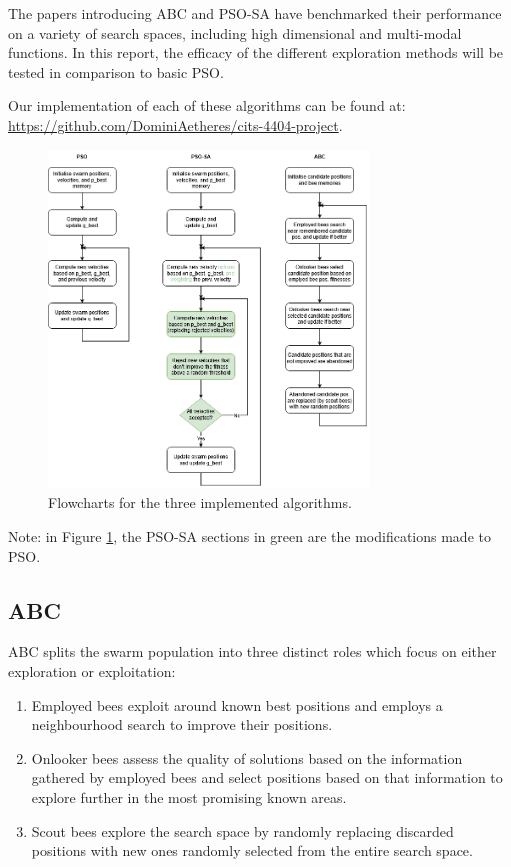 \documentclass[a4paper, 12pt]{extarticle}
\begin{document}
The papers introducing ABC and PSO-SA have benchmarked their performance on a variety of search spaces, including high dimensional and multi-modal functions. In this report, the efficacy of the different exploration methods will be tested in comparison to basic PSO. 

Our implementation of each of these algorithms can be found at:\newline
\href{https://github.com/DominiAetheres/cits-4404-project}{https://github.com/DominiAetheres/cits-4404-project}.

\begin{figure}[H]
    \centering
    \includegraphics[width=0.76\textwidth]{./assets/opt_alg.png}
    \caption{Flowcharts for the three implemented algorithms.}
    \label{fig:alg-flowchart}
\end{figure}

Note: in Figure \ref{fig:alg-flowchart}, the PSO-SA sections in green are the modifications made to PSO.

\subsection{ABC} 
ABC splits the swarm population into three distinct roles which focus on either exploration or exploitation: 

\begin{enumerate}
    \item Employed bees exploit around known best positions and employs a neighbourhood search to improve their positions. 
    \item Onlooker bees assess the quality of solutions based on the information gathered by employed bees and select positions based on that information to explore further in the most promising known areas.
    \item Scout bees explore the search space by randomly replacing discarded positions with new ones randomly selected from the entire search space. 
\end{enumerate}
\end{document}
